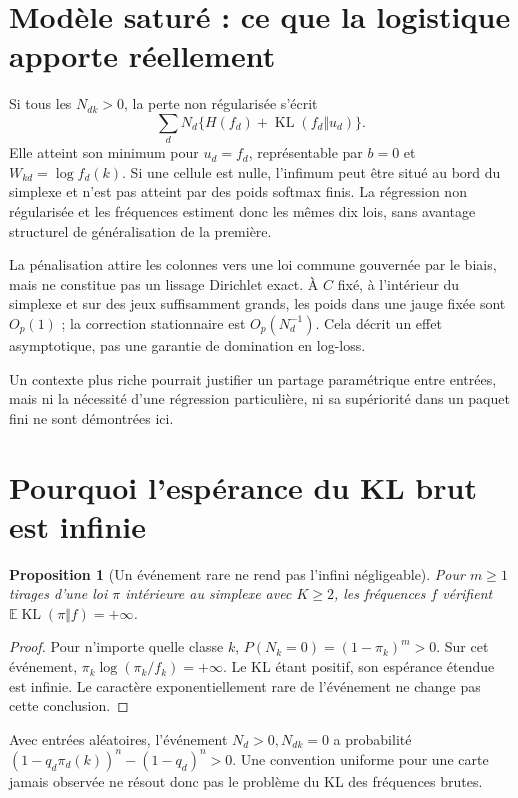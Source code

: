 \documentclass[11pt,a4paper]{article}
\newtheorem{proposition}{Proposition}
\theoremstyle{remark}\newtheorem*{remarque}{Remarque}
\newcommand{\E}{\mathbb E}
\newcommand{\KL}{\operatorname{KL}}
\newcommand{\1}{\mathbf 1}
\begin{document}
\section{Modèle saturé : ce que la logistique apporte réellement}
Si tous les $N_{dk}>0$, la perte non régularisée s'écrit
\[
 \sum_dN_d\{H(f_d)+\KL(f_d\Vert u_d)\}.
\]
Elle atteint son minimum pour $u_d=f_d$, représentable par $b=0$ et
$W_{kd}=\log f_d(k)$. Si une cellule est nulle, l'infimum peut être situé
au bord du simplexe et n'est pas atteint par des poids softmax finis.
La régression non régularisée et les fréquences estiment donc les mêmes dix
lois, sans avantage structurel de généralisation de la première.

La pénalisation attire les colonnes vers une loi commune gouvernée par le biais,
mais ne constitue pas un lissage Dirichlet exact. À $C$ fixé, à l'intérieur du
simplexe et sur des jeux suffisamment grands, les poids dans une jauge fixée
sont $O_p(1)$ ; la correction stationnaire est $O_p(N_d^{-1})$.
Cela décrit un effet asymptotique, pas une garantie de domination en log-loss.

Un contexte plus riche pourrait justifier un partage paramétrique entre entrées,
mais ni la nécessité d'une régression particulière, ni sa supériorité dans un
paquet fini ne sont démontrées ici.

\section{Pourquoi l'espérance du KL brut est infinie}
\begin{proposition}[Un événement rare ne rend pas l'infini négligeable]
Pour $m\ge1$ tirages d'une loi $\pi$ intérieure au simplexe avec $K\ge2$, les
fréquences $f$ vérifient $\E\KL(\pi\Vert f)=+\infty$.
\end{proposition}
\begin{proof}
Pour n'importe quelle classe $k$, $P(N_k=0)=(1-\pi_k)^m>0$.
Sur cet événement, $\pi_k\log(\pi_k/f_k)=+\infty$. Le KL étant positif,
son espérance étendue est infinie. Le caractère exponentiellement rare de
l'événement ne change pas cette conclusion.
\end{proof}
Avec entrées aléatoires, l'événement $N_d>0,N_{dk}=0$ a probabilité
$(1-q_d\pi_d(k))^n-(1-q_d)^n>0$. Une convention uniforme pour une carte
jamais observée ne résout donc pas le problème du KL des fréquences brutes.
\end{document}
